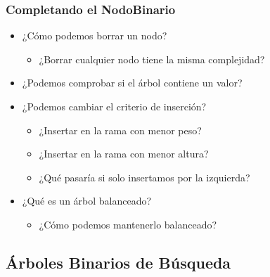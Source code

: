 \documentclass[11pt,handout]{beamer}
\begin{document}
\begin{frame}\frametitle{Completando el NodoBinario}
\begin{itemize}
	\item ¿Cómo podemos borrar un nodo?
	    \begin{itemize}
	    	\item ¿Borrar cualquier nodo tiene la misma complejidad?
	    \end{itemize}
	\item ¿Podemos comprobar si el árbol contiene un valor?
	\item ¿Podemos cambiar el criterio de inserción?
	    \begin{itemize}
	    	\item ¿Insertar en la rama con menor peso?
	    	\item ¿Insertar en la rama con menor altura?
	    	\item ¿Qué pasaría si solo insertamos por la izquierda?
	    \end{itemize}
	\item ¿Qué es un árbol balanceado?
	    \begin{itemize}
	    	\item ¿Cómo podemos mantenerlo balanceado?
	    \end{itemize}
\end{itemize}
\end{frame}

\subsection{Árboles Binarios de Búsqueda}
\end{document}
